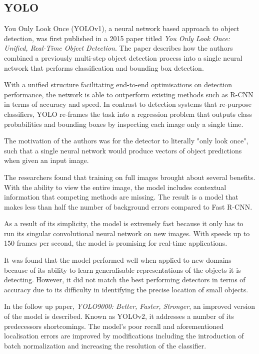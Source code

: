 \documentclass{thesis}
\begin{document}
\subsection{YOLO}

You Only Look Once (YOLOv1), a neural network based approach to object detection, was first published in a 2015 paper titled \textit{You Only Look Once: Unified, Real-Time Object Detection}. The paper describes how the authors combined a previously multi-step object detection process into a single neural network that performs classification and bounding box detection.

With a unified structure facilitating end-to-end optimisations on detection performance, the network is able to outperform existing methods such as R-CNN in terms of accuracy and speed\cite{yolov1}. In contrast to detection systems that re-purpose classifiers, YOLO re-frames the task into a regression problem that outputs class probabilities and bounding boxes by inspecting each image only a single time. 

The motivation of the authors was for the detector to literally "only look once", such that a single neural network would produce vectors of object predictions when given an input image.

The researchers found that training on full images brought about several benefits. With the ability to view the entire image, the model includes contextual information that competing methods are missing\cite{frcnn}. The result is a model that makes less than half the number of background errors compared to Fast R-CNN\cite{yolov1}.

As a result of its simplicity, the model is extremely fast because it only has to run its singular convolutional neural network on new images. With speeds up to 150 frames per second\cite{yolov1}, the model is promising for real-time applications.

It was found that the model performed well when applied to new domains because of its ability to learn generalisable representations of the objects it is detecting. However, it did not match the best performing detectors in terms of accuracy due to its difficulty in identifying the precise location of small objects.

In the follow up paper, \textit{YOLO9000: Better, Faster, Stronger}, an improved version of the model is described. Known as YOLOv2, it addresses a number of its predecessors shortcomings. The model's poor recall and aforementioned localisation errors are improved by modifications including the introduction of batch normalization and increasing the resolution of the classifier\cite{yolo2}.
\end{document}
